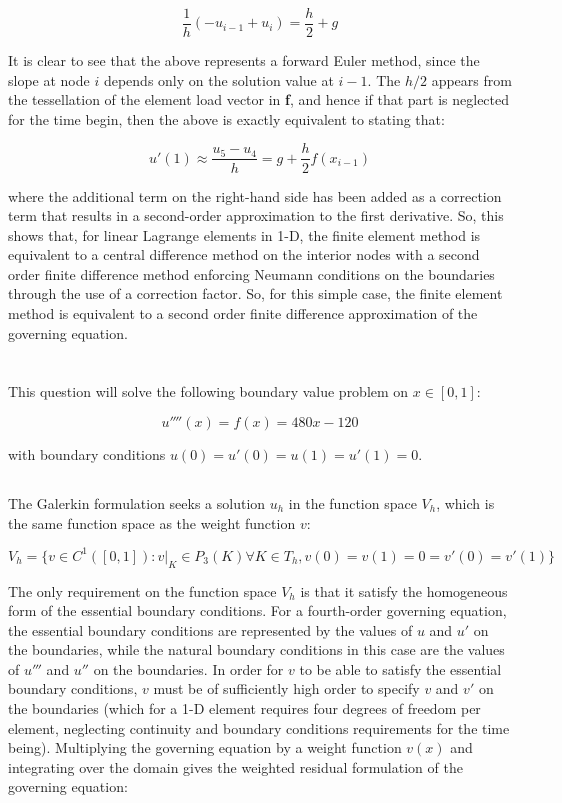 \documentclass[10pt]{article}
\newcommand{\beq}{\begin{equation}}
\newcommand{\eeq}{\end{equation}}
\begin{document}
\beq
\frac{1}{h}(-u_{i-1}+u_i)=\frac{h}{2}+g
\eeq

It is clear to see that the above represents a forward Euler method, since the slope at node \(i\) depends only on the solution value at \(i-1\). The \(h/2\) appears from the tessellation of the element load vector in \textbf{f}, and hence if that part is neglected for the time begin, then the above is exactly equivalent to stating that:

\beq
u'(1)\approx\frac{u_5-u_4}{h}=g+\frac{h}{2}f(x_{i-1})
\eeq

where the additional term on the right-hand side has been added as a correction term that results in a second-order approximation to the first derivative. So, this shows that, for linear Lagrange elements in 1-D, the finite element method is equivalent to a central difference method on the interior nodes with a second order finite difference method enforcing Neumann conditions on the boundaries through the use of a correction factor. So, for this simple case, the finite element method is equivalent to a second order finite difference approximation of the governing equation.

\section{}

This question will solve the following boundary value problem on \(x\in[0,1]\):

\beq
u''''(x)=f(x)=480x-120
\eeq

with boundary conditions \(u(0)=u'(0)=u(1)=u'(1)=0\). 

\subsection{}

The Galerkin formulation seeks a solution \(u_h\) in the function space \(V_h\), which is the same function space as the weight function \(v\):

\beq
V_h=\{v\in C^1([0,1]):v\rvert_K\in P_3(K) \forall K\in T_h, v(0)=v(1)=0=v'(0)=v'(1)\}
\eeq

The only requirement on the function space \(V_h\) is that it satisfy the homogeneous form of the essential boundary conditions. For a fourth-order governing equation, the essential boundary conditions are represented by the values of \(u\) and \(u'\) on the boundaries, while the natural boundary conditions in this case are the values of \(u'''\) and \(u''\) on the boundaries. In order for \(v\) to be able to satisfy the essential boundary conditions, \(v\) must be of sufficiently high order to specify \(v\) and \(v'\) on the boundaries (which for a 1-D element requires four degrees of freedom per element, neglecting continuity and boundary conditions requirements for the time being). Multiplying the governing equation by a weight function \(v(x)\) and integrating over the domain gives the weighted residual formulation of the governing equation:
\end{document}
